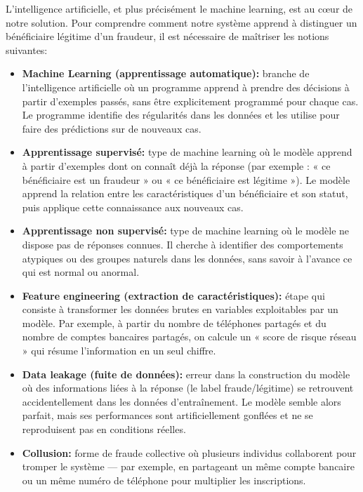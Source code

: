 \documentclass[a4paper, oneside, 12pt]{book}
\begin{document}
\hspace{0.5cm}L'intelligence artificielle, et plus précisément le machine learning, 
est au cœur de notre solution. Pour comprendre comment notre système apprend à 
distinguer un bénéficiaire légitime d'un fraudeur, il est nécessaire de maîtriser 
les notions suivantes:

\begin{itemize}[label=\textbullet]

    \item \textbf{Machine Learning (apprentissage automatique):} branche de 
    l'intelligence artificielle où un programme apprend à prendre des décisions 
    à partir d'exemples passés, sans être explicitement programmé pour chaque cas. 
    Le programme identifie des régularités dans les données et les utilise pour 
    faire des prédictions sur de nouveaux cas.

    \item \textbf{Apprentissage supervisé:} type de machine learning où le modèle 
    apprend à partir d'exemples dont on connaît déjà la réponse (par exemple : 
    « ce bénéficiaire est un fraudeur » ou « ce bénéficiaire est légitime »). Le 
    modèle apprend la relation entre les caractéristiques d'un bénéficiaire et son 
    statut, puis applique cette connaissance aux nouveaux cas.

    \item \textbf{Apprentissage non supervisé:} type de machine learning où le 
    modèle ne dispose pas de réponses connues. Il cherche à identifier des 
    comportements atypiques ou des groupes naturels dans les données, sans savoir 
    à l'avance ce qui est normal ou anormal.

    \item \textbf{Feature engineering (extraction de caractéristiques):} étape qui 
    consiste à transformer les données brutes en variables exploitables par un 
    modèle. Par exemple, à partir du nombre de téléphones partagés et du nombre de 
    comptes bancaires partagés, on calcule un « score de risque réseau » qui 
    résume l'information en un seul chiffre.

    \item \textbf{Data leakage (fuite de données):} erreur dans la construction du 
    modèle où des informations liées à la réponse (le label fraude/légitime) se 
    retrouvent accidentellement dans les données d'entraînement. Le modèle semble 
    alors parfait, mais ses performances sont artificiellement gonflées et ne se 
    reproduisent pas en conditions réelles.

    \item \textbf{Collusion:} forme de fraude collective où plusieurs individus 
    collaborent pour tromper le système — par exemple, en partageant un même 
    compte bancaire ou un même numéro de téléphone pour multiplier les inscriptions.

\end{itemize}
\end{document}
